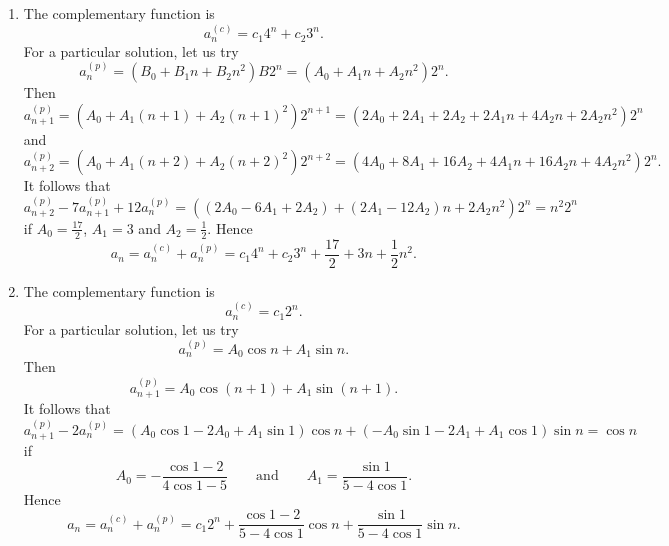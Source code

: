 \documentclass[a4paper]{article}
\begin{document}
\begin{enumerate}
\begin{enumerate}
			\item The complementary function is
			\begin{equation*}
				a_n^{(c)} = c_1 4^n + c_2 3^n.
			\end{equation*}
			For a particular solution, let us try
			\begin{equation*}
				a_n^{(p)} = (B_0 + B_1 n + B_2 n^2) B 2^n = (A_0 + A_1 n + A_2 n^2) 2^n.
			\end{equation*}
			Then
			\begin{equation*}
				a_{n+1}^{(p)} = \left(A_0 + A_1 (n+1) + A_2 (n+1)^2 \right) 2^{n+1} = (2 A_0 + 2 A_1 + 2 A_2 + 2 A_1 n + 4 A_2 n + 2 A_2 n^2) 2^n
			\end{equation*}
			and
			\begin{equation*}
				a_{n+2}^{(p)} = \left(A_0 + A_1 (n+2) + A_2 (n+2)^2 \right) 2^{n+2} = (4 A_0 + 8 A_1 + 16 A_2 + 4 A_1 n + 16 A_2 n + 4 A_2 n^2) 2^n.
			\end{equation*}
			It follows that
			\begin{equation*}
				a_{n+2}^{(p)} - 7a_{n+1}^{(p)} + 12a_{n}^{(p)} = \left( (2 A_0 - 6 A_1 + 2 A_2) + (2 A_1 - 12 A_2) n + 2 A_2 n^2 \right)  2^n = n^2 2^n
			\end{equation*}
			if $A_0 = \frac{17}{2}$, $A_1 = 3$ and $A_2 = \frac{1}{2}$. Hence
			\begin{equation*}
				a_n = a_n^{(c)} + a_n^{(p)} = c_1 4^n + c_2 3^n + \frac{17}{2} +  3 n + \frac{1}{2} n^2.
			\end{equation*}
			
			\item The complementary function is
			\begin{equation*}
				a_n^{(c)} = c_1 2^n.
			\end{equation*}
			For a particular solution, let us try
			\begin{equation*}
				a_n^{(p)} = A_0 \cos n + A_1 \sin n.
			\end{equation*}
			Then
			\begin{equation*}
				a_{n+1}^{(p)} = A_0 \cos (n+1) + A_1 \sin (n+1).
			\end{equation*}
			It follows that
			\begin{equation*}
				a_{n+1}^{(p)} - 2 a_{n}^{(p)} = (A_0 \cos 1 - 2 A_0 + A_1 \sin 1) \cos n + (- A_0 \sin 1 - 2 A_1 + A_1 \cos 1) \sin n = \cos n
			\end{equation*}
			if
			\begin{equation*}
				A_0 = - \frac{\cos 1 - 2}{4 \cos 1 - 5}
				\qquad \text{and} \qquad
				A_1 = \frac{\sin 1}{5 - 4 \cos 1}.
			\end{equation*}
			Hence
			\begin{equation*}
				a_n = a_n^{(c)} + a_n^{(p)} = c_1 2^n + \frac{\cos 1 - 2}{5 - 4 \cos 1} \cos n + \frac{\sin 1}{5 - 4 \cos 1} \sin n.
			\end{equation*}
			

\end{enumerate}
\end{enumerate}
\end{document}
